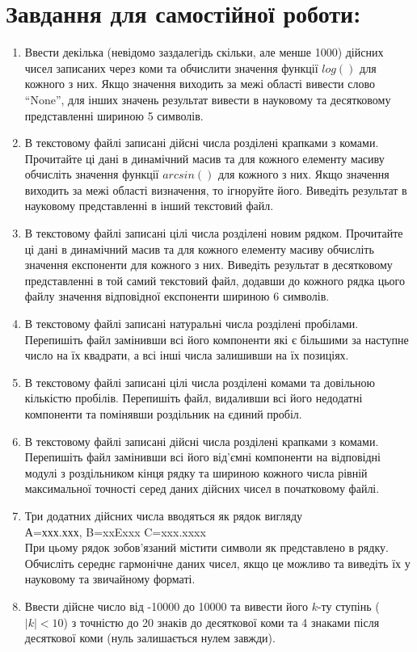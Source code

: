 \documentclass[a5paper,titlepage,openany,twoside,
]
{book_unv}%
\begin{document}
\section{Завдання для самостійної роботи:}

\begin{enumerate}
\def\labelenumi{\arabic{enumi})}
\setcounter{enumi}{5}
\item
  Ввести декілька (невідомо заздалегідь скільки, але менше 1000) дійсних чисел записаних
  через коми та обчислити значення функції $log()$ для кожного з них. Якщо
  значення виходить за межі області вивести слово ``None'', для інших
  значень результат вивести в науковому та десятковому представленні
  шириною 5 символів.

\item
  В текстовому файлі записані дійсні числа розділені
 крапками з комами. Прочитайте ці дані в динамічний масив та 
 для кожного елементу масиву обчисліть значення функції $arcsin()$ для кожного з них. 
 Якщо значення виходить за межі області визначення, то ігноруйте його. 
 Виведіть результат в науковому представленні в інший текстовий файл.

\item
  В текстовому файлі записані цілі числа розділені
новим рядком. Прочитайте ці дані в динамічний масив та 
 для кожного елементу масиву обчисліть значення експоненти для кожного з них. 
 Виведіть результат в десятковому представленні в той самий текстовий файл,
додавши до кожного рядка цього файлу значення відповідної експоненти шириною 6 символів.

\item
  В текстовому файлі записані натуральні числа розділені
пробілами. Перепишіть файл замінивши всі його компоненти які є
більшими за наступне число на їх квадрати, а всі інші числа залишивши на їх позиціях.

\item
  В текстовому файлі записані цілі числа розділені комами та довільною кількістю пробілів. 
 Перепишіть файл, видаливши всі його недодатні компоненти та помінявши роздільник на єдиний пробіл.

\item
В текстовому файлі записані дійсні числа розділені
 крапками з комами.  Перепишіть файл замінивши всі його від'ємні компоненти 
на відповідні модулі з роздільником кінця рядку та шириною кожного числа рівній
максимальної точності серед даних дійсних чисел в початковому файлі.
   

\item
  Три додатних дійсних числа вводяться як рядок вигляду \\
  А=ххх.ххх, B=xxExxx C=xxx.xxxx\\
  При цьому рядок зобов'язаний містити символи як представлено в рядку.  
Обчисліть середнє гармонічне даних чисел, якщо це можливо 
та виведіть їх у науковому та звичайному форматі.
\item
  Ввести дійсне число від -10000 до 10000 та вивести його $k$-ту ступінь
  ($|k|<10$) з точністю до 20 знаків до десяткової коми та 4
  знаками після десяткової коми (нуль залишається нулем завжди).


\end{enumerate}
\end{document}
